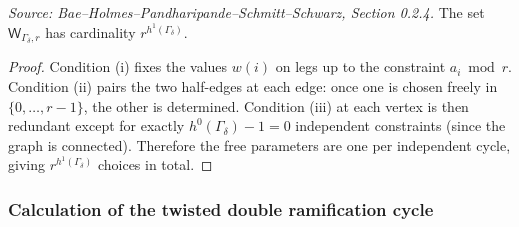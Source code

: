 \begin{lemma}
  \label{lem:weightings_cardinality}
  \textit{Source: Bae--Holmes--Pandharipande--Schmitt--Schwarz, Section 0.2.4.}
  The set $\mathsf{W}_{\Gamma_\delta,r}$ has cardinality $r^{h^1(\Gamma_\delta)}$.
\end{lemma}

\begin{proof}
  Condition (i) fixes the values $w(i)$ on legs up to the constraint $a_i \bmod r$.
  Condition (ii) pairs the two half-edges at each edge: once one is chosen freely in
  $\{0,\ldots,r-1\}$, the other is determined.  Condition (iii) at each vertex is then
  redundant except for exactly $h^0(\Gamma_\delta) - 1 = 0$ independent constraints
  (since the graph is connected).  Therefore the free parameters are one per independent
  cycle, giving $r^{h^1(\Gamma_\delta)}$ choices in total.
\end{proof}

\subsubsection{Calculation of the twisted double ramification cycle}

